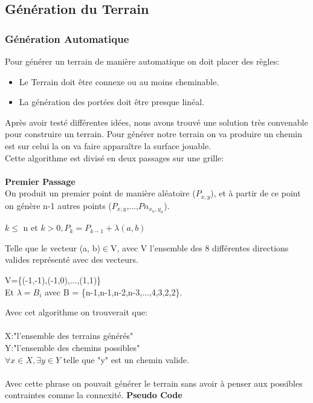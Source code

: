 \documentclass{article}
\begin{document}
\subsection{Génération du Terrain}
\subsubsection{Génération Automatique}
Pour générer un terrain de manière automatique on doit placer des règles:
\begin{itemize}
\item Le Terrain doit être connexe ou au moins cheminable.
\item La génération des portées doit être presque linéal.

\end{itemize}
Après avoir testé différentes idées, nous avons trouvé une solution très convenable pour construire un terrain. Pour générer notre terrain on va produire un chemin est sur celui la on va faire apparaître la surface jouable.\\
Cette algorithme est divisé en deux passages sur une grille:\\~\\
\textbf{\Large{Premier Passage}}\\
On produit un premier point de manière aléatoire ($P_{x,y}$), et à partir de ce point on génère n-1 autres points ($P_{x,y}$,...,$Pn_{x_n,y_n}$).
\begin{center}
	$k\leq$ n et $k>0, P_{k} = P_{k-1} + \lambda(a, b)$
\end{center}
Telle que le vecteur (a, b)$\in$V, avec V l'ensemble des 8 différentes directions valides représenté avec des vecteurs.
\begin{center}
	V=\{(-1,-1),(-1,0),...,(1,1)\}\\
	Et $\lambda = B_i$ avec B = \{n-1,n-1,n-2,n-3,...,4,3,2,2\}.
\end{center}
Avec cet algorithme on trouverait que:\\~\\
X:"l'ensemble des terrains générés" \\
Y:"l'ensemble des chemins possibles"\\
\(\forall x \in X, \exists y \in Y\) telle que "y" est un chemin valide.\\~\\
Avec cette phrase on pouvait générer le terrain sans avoir à penser aux possibles contraintes comme la connexité.
\newpage
\textbf{\Large{Pseudo Code}}\\~\\
\end{document}
